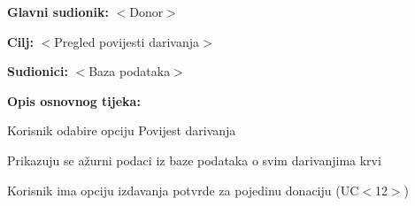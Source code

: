 					\noindent {}
					\begin{packed_item}
						
						\item \textbf{Glavni sudionik:} $<$Donor$>$
						\item \textbf{Cilj:} $<$Pregled povijesti darivanja$>$
						\item \textbf{Sudionici:} $<$Baza podataka$>$
						\item \textbf{Opis osnovnog tijeka:}
						
						\begin{packed_enum}
							
							\item Korisnik odabire opciju Povijest darivanja
							\item Prikazuju se ažurni podaci iz baze podataka o svim darivanjima krvi
							\item Korisnik ima opciju izdavanja potvrde za pojedinu donaciju (UC$<$12$>$)
							
						\end{packed_enum}
						
					\end{packed_item}
					

